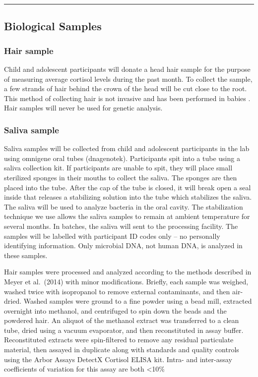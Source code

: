 \documentclass[
]{book}
\begin{document}
\begin{center}\rule{0.5\linewidth}{0.5pt}\end{center}

\hypertarget{biological-samples}{%
\subsection{Biological Samples}\label{biological-samples}}

\hypertarget{hair-sample}{%
\subsubsection{Hair sample}\label{hair-sample}}

Child and adolescent participants will donate a head hair sample for the purpose of measuring average cortisol levels during the past month. To collect the sample, a few strands of hair behind the crown of the head will be cut close to the root. This method of collecting hair is not invasive and has been performed in babies \citep[32 weeks of age;][]{staufenbiel_2013}. Hair samples will never be used for genetic analysis.

\hypertarget{saliva-sample}{%
\subsubsection{Saliva sample}\label{saliva-sample}}

Saliva samples will be collected from child and adolescent participants in the lab using omnigene oral tubes (dnagenotek). Participants spit into a tube using a saliva collection kit. If participants are unable to spit, they will place small sterilized sponges in their mouths to collect the saliva. The sponges are then placed into the tube. After the cap of the tube is closed, it will break open a seal inside that releases a stabilizing solution into the tube which stabilizes the saliva. The saliva will be used to analyze bacteria in the oral cavity. The stabilization technique we use allows the saliva samples to remain at ambient temperature for several months. In batches, the saliva will sent to the processing facility. The samples will be labelled with participant ID codes only -- no personally identifying information. Only microbial DNA, not human DNA, is analyzed in these samples.

Hair samples were processed and analyzed according to the methods described in Meyer et al.~(2014) with minor modifications. Briefly, each sample was weighed, washed twice with isopropanol to remove external contaminants, and then air-dried. Washed samples were ground to a fine powder using a bead mill, extracted overnight into methanol, and centrifuged to spin down the beads and the powdered hair. An aliquot of the methanol extract was transferred to a clean tube, dried using a vacuum evaporator, and then reconstituted in assay buffer. Reconstituted extracts were spin-filtered to remove any residual particulate material, then assayed in duplicate along with standards and quality controls using the Arbor Assays DetectX Cortisol ELISA kit. Intra- and inter-assay coefficients of variation for this assay are both \textless10\%
\end{document}
